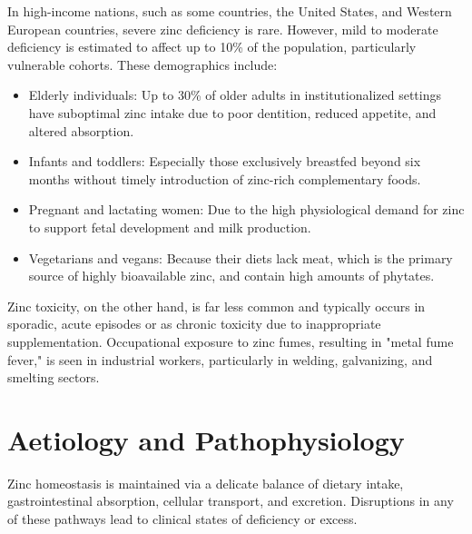 In high-income nations, such as some countries, the United States, and Western European countries, severe zinc deficiency is rare. However, mild to moderate deficiency is estimated to affect up to 10\% of the population, particularly vulnerable cohorts. These demographics include:
\begin{itemize}
    \item Elderly individuals: Up to 30\% of older adults in institutionalized settings have suboptimal zinc intake due to poor dentition, reduced appetite, and altered absorption.
    \item Infants and toddlers: Especially those exclusively breastfed beyond six months without timely introduction of zinc-rich complementary foods.
    \item Pregnant and lactating women: Due to the high physiological demand for zinc to support fetal development and milk production.
    \item Vegetarians and vegans: Because their diets lack meat, which is the primary source of highly bioavailable zinc, and contain high amounts of phytates.
\end{itemize}

Zinc toxicity, on the other hand, is far less common and typically occurs in sporadic, acute episodes or as chronic toxicity due to inappropriate supplementation. Occupational exposure to zinc fumes, resulting in "metal fume fever," is seen in industrial workers, particularly in welding, galvanizing, and smelting sectors.

\section*{Aetiology and Pathophysiology}
Zinc homeostasis is maintained via a delicate balance of dietary intake, gastrointestinal absorption, cellular transport, and excretion. Disruptions in any of these pathways lead to clinical states of deficiency or excess.

